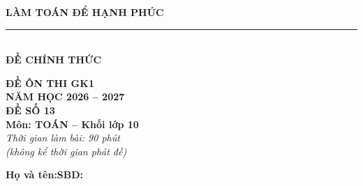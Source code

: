 \documentclass[12pt,a4paper]{article}
\begin{document}
\noindent
\begin{minipage}[c]{0.38\textwidth}
    \centering
    \textbf{LÀM TOÁN ĐỂ HẠNH PHÚC}\\[-2pt]
    \rule{3.2cm}{0.6pt}\\[4pt]
    \textbf{ĐỀ CHÍNH THỨC}
\end{minipage}\hfill
\begin{minipage}[c]{0.35\textwidth}
    \centering
    \textbf{ĐỀ ÔN THI GK1}\\
    \textbf{NĂM HỌC 2026 -- 2027}\\[2pt]
    \textbf{ĐỀ SỐ 13}\\
    \textbf{Môn: TOÁN -- Khối lớp 10}\\
    \textit{\small Thời gian làm bài: 90 phút\\(không kể thời gian phát đề)}
\end{minipage}

\vspace{0.15cm}
\noindent
\begin{minipage}[b]{0.78\textwidth}
    \textbf{Họ và tên:}\dotfill\textbf{SBD:}\makebox[3.5cm]{\dotfill}
\end{minipage}\hfill
\begin{minipage}[b]{0.20\textwidth}
    \hfill
    \setlength{\fboxrule}{0.8pt}%
\end{minipage}
\vspace{0.15cm}
\end{document}
